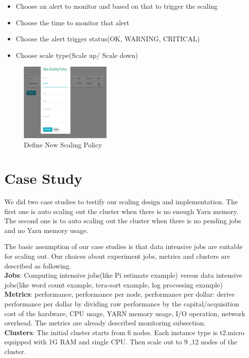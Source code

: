 \documentclass{article}
\begin{document}
\begin{enumerate}
  \begin{itemize}
  \item Choose an alert to monitor and based on that to trigger the scaling
  \item Choose the time to monitor that alert
  \item Choose the alert trigger status(OK, WARNING, CRITICAL)
  \item Choose scale type(Scale up/ Scale down)
  \end{itemize}
 \begin{figure}[ht!]
 \centering
 \includegraphics[width=0.4\textwidth,natwidth=1000,natheight=800]{addNewPolicy.png}
 \caption{Define New Scaling Policy}
 \label{fig:addNewPolicy}
 \end{figure}
 
\end{enumerate}


\section{Case Study}
We did two case studies to testify our scaling design and implementation. The first one is auto scaling out the cluster when there is no enough Yarn memory. The second one is to auto scaling out the cluster when there is no pending jobs and no Yarn memory usage. 

The basic assumption of our case studies is that data intensive jobs are suitable for scaling out. Our choices about experiment jobs, metrics and clusters are described as following.\\
\textbf{Jobs}: Computing intensive jobs(like Pi estimate example) versus data intensive jobs(like word count example, tera-sort example, log processing example)\\
\textbf{Metrics}: performance, performance per node,  performance per dollar: derive performance per dollar by dividing raw performance by the capital/acquisition cost of the hardware, CPU usage, YARN memory usage, I/O operation, network overhead. The metrics are already described  monitoring subsection.\\
\textbf{Clusters}: The initial cluster starts from 6 nodes. Each instance type is t2.micro equipped with 1G RAM and single CPU. Then scale out to 9 ,12 nodes of the cluster.
\end{document}
